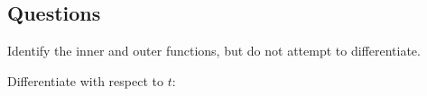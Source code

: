 \subsection*{Questions}
\begin{questions}
  \questioA Identify the inner and outer functions, but do not attempt to differentiate.
  \questioA Differentiate with respect to $ t $:
    \begin{multicols}{2}
\end{multicols}
\end{questions}
